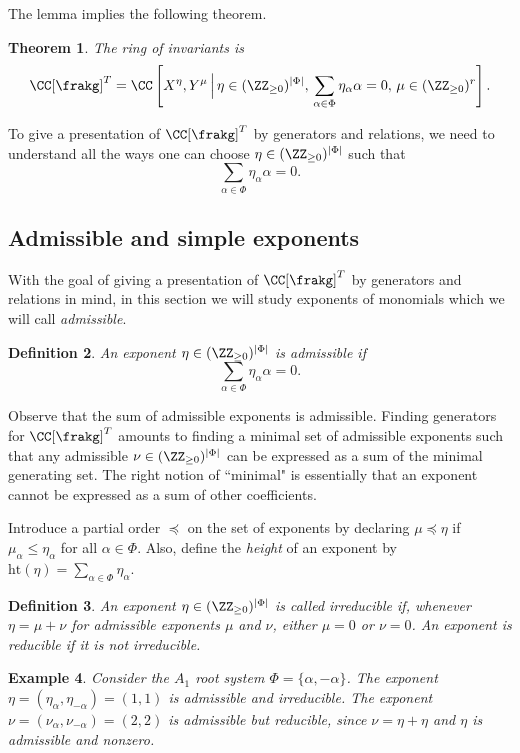 \documentclass[12pt]{amsart}
\theoremstyle{plain}
\newtheorem{theorem}{Theorem}%
\newtheorem{definition}[theorem]{Definition}
\newtheorem{example}[theorem]{Example}
\begin{document}
The lemma implies the following theorem.

\begin{theorem}
    The ring of invariants is
    $$\CC[\frakg]^T = \CC\left[X^\eta, Y^\mu \, \Big| \, \eta \in (\ZZ_{\ge0})^{|\Phi|}, \,\sum_{\alpha\in\Phi} \eta_\alpha \alpha = 0, \, \mu \in (\ZZ_{\ge0})^r\right].$$
\end{theorem}

To give a presentation of $\CC[\frakg]^T$ by generators and relations, we need to understand all the ways one can choose $\eta \in (\ZZ_{\ge0})^{|\Phi|}$ such that
$$\sum_{\alpha \in \Phi} \eta_\alpha \alpha = 0.$$

\subsection{Admissible and simple exponents}
With the goal of giving a presentation of $\CC[\frakg]^T$ by generators and relations in mind, in this section we will study exponents of monomials which we will call \emph{admissible}.

\begin{definition}
    An exponent $\eta \in (\ZZ_{\ge 0})^{|\Phi|}$ is \emph{admissible} if
    $$\sum_{\alpha \in \Phi} \eta_\alpha \alpha = 0.$$
\end{definition}

Observe that the sum of admissible exponents is admissible.
Finding generators for $\CC[\frakg]^T$ amounts to finding a minimal set of admissible exponents such that any admissible $\nu \in (\ZZ_{\ge0})^{|\Phi|}$ can be expressed as a sum of the minimal generating set.
The right notion of ``minimal" is essentially that an exponent cannot be expressed as a sum of other coefficients.

Introduce a partial order $\preceq$ on the set of exponents by declaring $\mu \preceq \eta$ if $\mu_\alpha \le \eta_\alpha$ for all $\alpha \in \Phi$.
Also, define the \emph{height} of an exponent by $\mathrm{ht}(\eta)=\sum_{\alpha\in\Phi} \eta_\alpha$.

\begin{definition}
An exponent $\eta \in (\ZZ_{\ge 0})^{|\Phi|}$ is called \emph{irreducible} if, whenever $\eta = \mu + \nu$ for admissible exponents $\mu$ and $\nu$, either $\mu=0$ or $\nu=0$. An exponent is reducible if it is not irreducible.
\end{definition}

\begin{example}
    Consider the $A_1$ root system $\Phi=\{\alpha,-\alpha\}$.
    The exponent $\eta=(\eta_\alpha, \eta_{-\alpha}) = (1, 1)$ is admissible and irreducible.
    The exponent $\nu=(\nu_\alpha, \nu_{-\alpha}) = (2, 2)$ is admissible but reducible, since $\nu = \eta + \eta$ and $\eta$ is admissible and nonzero.
\end{example}
\end{document}
